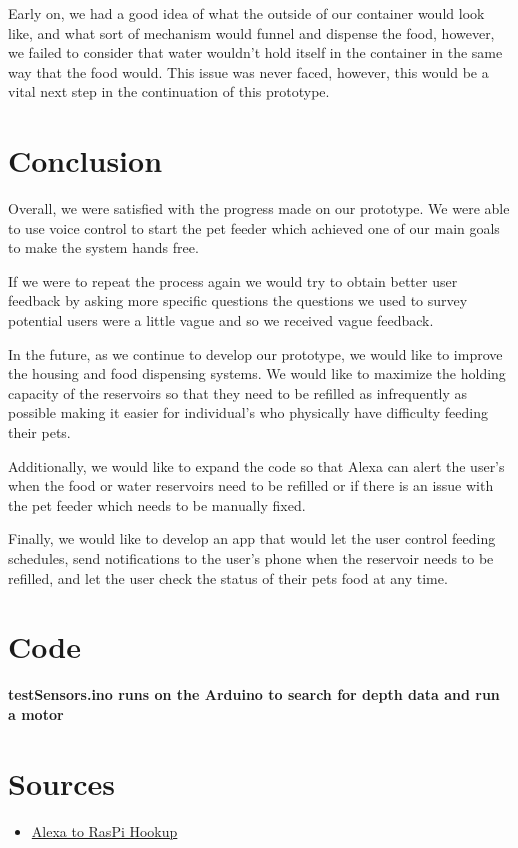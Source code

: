 \documentclass[notitlepage,11pt]{article}
\begin{document}
        Early on, we had a good idea of what the outside of our container would look like, and what sort of mechanism 
        would funnel and dispense the food, however, we failed to consider that water wouldn't hold itself in the 
        container in the same way that the food would. This issue was never faced, however, this would be a vital next 
        step in the continuation of this prototype. 

    \section{Conclusion}
        Overall, we were satisfied with the progress made on our prototype. We were able to use voice control to start 
        the pet feeder which achieved one of our main goals to make the system hands free. 

        If we were to repeat the process again we would try to obtain better user feedback by asking more specific 
        questions the questions we used to survey potential users were a little vague and so we received vague feedback.

        In the future, as we continue to develop our prototype, we would like to improve the housing and food dispensing 
        systems. We would like to maximize the holding capacity of the reservoirs so that they need to be refilled as 
        infrequently as possible making it easier for individual's who physically have difficulty feeding their pets.

        Additionally, we would like to expand the code so that Alexa can alert the user's when the food or water 
        reservoirs need to be refilled or if there is an issue with the pet feeder which needs to be manually fixed.

        Finally, we would like to develop an app that would let the user control feeding schedules, send notifications 
        to the user's phone when the reservoir needs to be refilled, and let the user check the status of their pets 
        food at any time.

    \newpage

    \section{Code}
        \textbf{testSensors.ino runs on the Arduino to search for depth data and run a motor}

    \section{Sources}
    \begin{itemize}
        \item \href{https://github.com/n8henrie/fauxmo}{Alexa to RasPi Hookup}
    \end{itemize}
\end{document}
